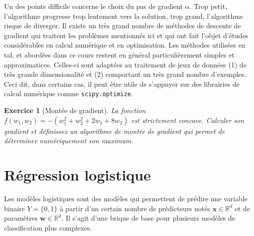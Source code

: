 \documentclass[11pt,openany]{book}
\newtheorem{exo}{Exercice}[chapter]
\newcommand{\ac}[1]{{\sc #1}} %
\begin{document}
Un des points difficile concerne le choix du pas de gradient $\alpha$.
Trop petit, l'algorithme progresse trop lentement vers la solution,
trop grand, l'algorithme risque de diverger. Il existe un très grand
nombre de méthodes de descente de gradient qui traitent les problèmes
mentionnés ici et qui ont fait l'objet d'études considérables en
calcul numérique et en optimisation. 
Les méthodes utilisées en \ac{tal}, et abordées dans ce cours restent en général particulièrement
simples et approximatices. Celles-ci sont adaptées au traitement de jeux de données (1) de très
grande dimensionalité et (2) comportant un très grand nombre d'exemples.
Ceci dit, dans certains cas, il peut être utile de s'appuyer sur des librairies de
calcul numérique comme {\tt scipy.optimize}.

\begin{exo}[Montée de gradient]
La fonction $f(w_1,w_2)= -(w_1^2+w_2^2+2w_1+8w_2)$ est
strictement concave. Calculer son gradient et définissez un algorithme de montée de gradient
qui permet de déterminer numériquement son maximum.
\end{exo}


\section{Régression logistique}

Les modèles logistiques sont des modèles qui permettent de prédire une
variable binaire $Y =  \{0,1\}$ à partir d'un certain nombre de
prédicteurs notés $\mathbf{x}\in \mathbb{R}^d$ et de paramètres $\mathbf{w}\in \mathbb{R}^d$.
Il s'agit d'une brique de base pour plusieurs modèles de classification plus complexes.
\end{document}
